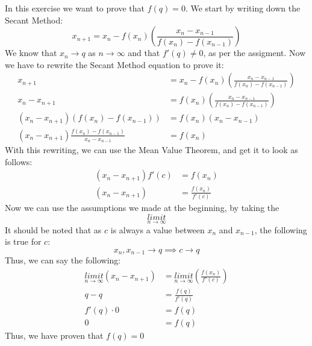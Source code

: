 In this exercise we want to prove that $f(q) = 0$. We start by writing down the Secant Method:
$$
x_{n+1} = x_n - f(x_n) \left( \frac{x_n-x_{n-1}}{f(x_n)-f(x_{n-1})}\right)
$$
We know that $x_n \rightarrow q$ as $n \rightarrow \infty$ and that $f'(q) \neq 0$, as per the assigment. Now we have to rewrite the Secant Method equation to prove it:
\begin{align*}
  x_{n+1} &= x_n - f(x_n) \left( \frac{x_n-x_{n-1}}{f(x_n)-f(x_{n-1})}\right) \\
  x_n - x_{n+1} &= f(x_n) \left( \frac{x_n-x_{n-1}}{f(x_n)-f(x_{n-1})}\right) \\
  \left(x_n - x_{n+1}\right)\left(f(x_n)-f(x_{n-1})\right) &= f(x_n) \left(x_n-x_{n-1}\right) \\
  \left(x_n - x_{n+1}\right)\frac{f(x_n)-f(x_{n-1})}{x_n-x_{n-1}} &= f(x_n)
\end{align*}
With this rewriting, we can use the Mean Value Theorem, and get it to look as follows:
\begin{align*}
  \left(x_n - x_{n+1}\right)f'(c) &= f(x_n) \\
  \left(x_n - x_{n+1}\right) &= \frac{f(x_n)}{f'(c)}
\end{align*}
Now we can use the assumptions we made at the beginning, by taking the\\
$$
\underset{n \rightarrow \infty}{limit}
$$
It should be noted that as $c$ is always a value between $x_n$ and $x_{n-1}$, the following is true for $c$:
$$
x_n, x_{n-1} \rightarrow q \implies c \rightarrow q
$$
Thus, we can say the following:
\begin{align*}
  \underset{n \rightarrow \infty}{limit} \left(x_n - x_{n+1}\right) &=   \underset{n \rightarrow \infty}{limit} \left(\frac{f(x_n)}{f'(c)}\right) \\
  q - q &= \frac{f(q)}{f'(q)} \\
  f'(q) \cdot 0 &= f(q) \\
  0 &= f(q)
\end{align*}
Thus, we have proven that $f(q) = 0$
